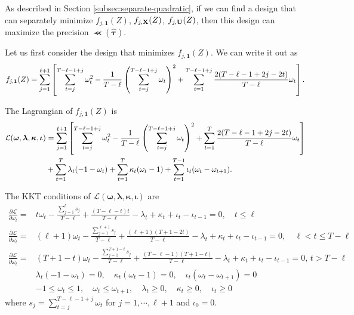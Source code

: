 		
		
		As described in Section \ref{subsec:separate-quadratic}, if we can find a design that can separately minimize $f_{j,\bm{1}}(Z)$, $f_{j,\mathbf{X}}(Z)$, $f_{j,\mathbf{U}}(Z)$, then this design can maximize the precision $\Prec(\hat{\bm{\tau}})$. 
		
		
		Let us first consider the design that minimizes $f_{j,\bm{1}}(Z)$. We can write it out as
		\begin{align}\label{eqn:fj1z}
		    f_{j,\bm{1}}(Z) = \sum_{j = 1}^{\ell+1} \left[ \sum_{t = j}^{T - \ell-1+j} \omega_t^2  - \frac{1}{T - \ell} \left(  \sum_{t=j}^{T - \ell-1+j} \omega_t \right)^2 +  \sum_{t = 1}^{T - \ell-1+j} \frac{2(T - \ell-1+2j-2t)}{T - \ell}  \omega_t  \right].
		\end{align}
		
		The Lagrangian of $f_{j,\bm{1}}(Z)$ is 
		\begin{align*}
			\mathcal{L}(\bm{\omega}, \bm{\lambda}, \bm{\kappa}, \bm{\iota}) &= \sum_{j = 1}^{\ell+1} \left[ \sum_{t = j}^{T - \ell-1+j} \omega_t^2  - \frac{1}{T - \ell} \left(  \sum_{t=j}^{T - \ell-1+j} \omega_t \right)^2 +  \sum_{t = 1}^T \frac{2(T - \ell-1+2j-2t)}{T - \ell}  \omega_t  \right] \\
			&  + \sum_{t=1}^T \lambda_t (-1 - \omega_t) + \sum_{t=1}^T \kappa_t (\omega_t - 1) + \sum_{t=1}^{T-1} \iota_t ( \omega_t - \omega_{t+1}). 
		\end{align*}
		
		
		The KKT conditions of $\mathcal{L}(\bm{\omega}, \bm{\lambda}, \bm{\kappa}, \bm{\iota})$ are
		\begin{align}
		\frac{\partial \mathcal{L}}{\partial \omega_t } =& t \omega_t - \frac{\sum_{j=1}^t s_j}{T - \ell}  + \frac{(T - \ell - t)t}{T - \ell} - \lambda_t + \kappa_t + \iota_t - \iota_{t-1} = 0, \quad t \leq \ell \label{eqn:kkt-small-t} \\
		\frac{\partial \mathcal{L}}{\partial \omega_t } =& (\ell+1) \omega_t - \frac{\sum_{j=1}^{\ell+1} s_j }{T - \ell} + \frac{(\ell+1)(T+1-2t)}{T - \ell}  - \lambda_t + \kappa_t + \iota_t - \iota_{t-1} = 0, \quad \ell <  t \leq T - \ell \label{eqn:kkt-medium-t} \\
		\frac{\partial \mathcal{L}}{\partial \omega_t } =& (T+1-t) \omega_t - \frac{\sum_{j=1}^{T+1-t} s_j}{T - \ell}  + \frac{(T - \ell - 1)(T+1-t)}{T - \ell}  - \lambda_t + \kappa_t + \iota_t - \iota_{t-1} = 0, \, t >  T - \ell  \label{eqn:kkt-large-t} \\
		\nonumber & \lambda_t (-1 - \omega_t) = 0, \quad \kappa_t (\omega_t - 1) = 0, \quad \iota_t ( \omega_t - \omega_{t+1}) = 0 \\
		\nonumber & -1 \leq \omega_t \leq 1, \quad \omega_t \leq \omega_{t+1},\quad  \lambda_t \geq 0, \quad \kappa_t \geq 0, \quad \iota_t \geq 0
		\end{align}
		where $s_j = \sum_{t=j}^{T - \ell-1+j} \omega_t$ for $j = 1, \cdots, \ell+1$ and $\iota_0 = 0$.
		
